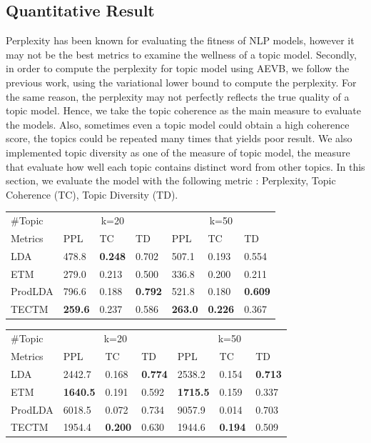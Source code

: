 \subsection{Quantitative Result}
Perplexity has been known for evaluating the fitness of NLP models, however it may not be the best metrics to examine the wellness of a topic model\cite{newman_automatic_nodate}.
Secondly, in order to compute the perplexity for topic model using AEVB, we follow the previous work, using the variational lower bound to compute the perplexity.
For the same reason, the perplexity may not perfectly reflects the true quality of a topic model. 
Hence, we take the topic coherence \cite{mimno_optimizing_2011} as the main measure to evaluate the models.
Also, sometimes even a topic model could obtain a high coherence score, the topics could be repeated many times that yields poor result. 
We also implemented topic diversity \cite{dieng_topic_2019} as one of the measure of topic model, the measure that evaluate how well each topic contains distinct word from other topics. 
In this section, we evaluate the model with the following metric : Perplexity, Topic Coherence (TC), Topic Diversity (TD).
\begin{table}[h]
\centering
\begin{tabular}{lllllll}
\hline
\#Topic     & \multicolumn{3}{c}{k=20} & \multicolumn{3}{c}{k=50} \\
Metrics     & PPL     & TC     & TD    & PPL     & TC     & TD    \\ \hline
LDA     & 478.8 & \textbf{0.248} & 0.702 & 507.1 & 0.193 & 0.554 \\
ETM     & 279.0 & 0.213 & 0.500 & 336.8 & 0.200 & 0.211 \\
ProdLDA & 796.6 & 0.188 & \textbf{0.792} & 521.8 & 0.180 & \textbf{0.609} \\
TECTM   & \textbf{259.6} & 0.237 & 0.586 & \textbf{263.0} & \textbf{0.226} & 0.367
\\ \hline
\end{tabular}
\end{table}
\begin{table}[h]
\centering
\begin{tabular}{lllllll}
\hline
\#Topic     & \multicolumn{3}{c}{k=20} & \multicolumn{3}{c}{k=50} \\
Metrics     & PPL      & TC      & TD  & PPL      & TC      & TD  \\
\hline
LDA     & 2442.7 & 0.168 & \textbf{0.774} & 2538.2 & 0.154 & \textbf{0.713} \\
ETM     & \textbf{1640.5} & 0.191 & 0.592 & \textbf{1715.5} & 0.159 & 0.337 \\
ProdLDA & 6018.5 & 0.072 & 0.734 & 9057.9 & 0.014 & 0.703 \\
TECTM   & 1954.4 & \textbf{0.200} & 0.630 & 1944.6 & \textbf{0.194} & 0.509 \\
\hline
\end{tabular}
\end{table}
